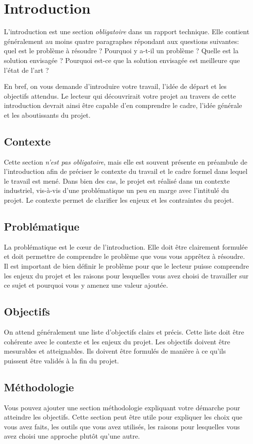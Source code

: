 \chapter{Introduction}

L'introduction est une section \emph{obligatoire} dans un rapport technique. Elle contient généralement au moins quatre paragraphes répondant aux questions suivantes: quel est le problème à résoudre ? Pourquoi y a-t-il un problème ? Quelle est la solution envisagée ? Pourquoi est-ce que la solution envisagée est meilleure que l'état de l'art ?

En bref, on vous demande d'introduire votre travail, l'idée de départ et les objectifs attendus. Le lecteur qui découvrirait votre projet au travers de cette introduction devrait ainsi être capable d'en comprendre le cadre, l'idée générale et les aboutissants du projet.

\section{Contexte}

Cette section \emph{n'est pas obligatoire}, mais elle est souvent présente en préambule de l'introduction afin de préciser le contexte du travail \cad et le cadre formel dans lequel le travail est mené. Dans bien des cas, le projet est réalisé dans un contexte industriel, vis-à-vis d'une problématique un peu en marge avec l'intitulé du projet. Le contexte permet de clarifier les enjeux et les contraintes du projet.

\section{Problématique}

La problématique est le cœur de l'introduction. Elle doit être clairement formulée et doit permettre de comprendre le problème que vous vous apprêtez à résoudre. Il est important de bien définir le problème pour que le lecteur puisse comprendre les enjeux du projet et les raisons pour lesquelles vous avez choisi de travailler sur ce sujet et pourquoi vous y amenez une valeur ajoutée.

\section{Objectifs}

On attend généralement une liste d'objectifs clairs et précis. Cette liste doit être cohérente avec le contexte et les enjeux du projet. Les objectifs doivent être mesurables et atteignables. Ils doivent être formulés de manière à ce qu'ils puissent être validés à la fin du projet.

\section{Méthodologie}

Vous pouvez ajouter une section méthodologie expliquant votre démarche pour atteindre les objectifs. Cette section peut être utile pour expliquer les choix que vous avez faits, les outils que vous avez utilisés, les raisons pour lesquelles vous avez choisi une approche plutôt qu'une autre.
